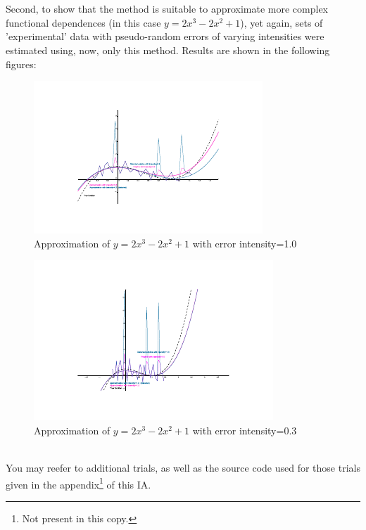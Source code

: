 \\ \\Second, to show that the method is suitable to approximate more complex functional dependences (in this case $y=2x^{3}-2x^{2}+1$), yet again, sets of 'experimental' data with pseudo-random errors of varying intensities were estimated using, now, only this method. Results are shown in the following figures: 
\begin{figure}[h!]%
\centering
\includegraphics[scale=2.5]{pic-prog2-c-not3}
\caption{Approximation of $y=2x^{3}-2x^{2}+1$ with error intensity=1.0}
\label{fig:results-1}
\end{figure}
\begin{figure}[h!]%
\centering
\includegraphics[scale=2.5]{pic-prog2-c-1}
\caption{Approximation of $y=2x^{3}-2x^{2}+1$ with error intensity=0.3}%
\label{fig:results-2}%
\end{figure}
\\You may reefer to additional trials, as well as the source code used for those trials given in the appendix\footnote{Not present in this copy.} of this IA.
\newpage

